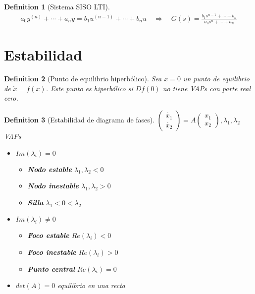 \documentclass[leqno]{article}
\newtheorem*{definition}{Definition}
\begin{document}
\begin{definition}[Sistema SISO LTI]
  \begin{align*}
    a_0y^{(n)} + \cdots + a_ny = b_1 u^{(n-1)} + \cdots + b_n u \quad \Rightarrow \quad G(s)= \frac{b_1s ^{n-1} + \cdots+ b_n}{a_0s^n + \cdots + a_n}
  \end{align*}

\end{definition}

\section{Estabilidad}

\begin{definition}[Punto de equilibrio hiperbólico] Sea  $x=0$ un punto de equilibrio de $\dot{x}=f(x)$. Este punto es hiperbólico si $Df(0)$ no tiene VAPs con parte real cero.

\end{definition}

\begin{definition}[Estabilidad de diagrama de fases] $\begin{pmatrix} \dot{x_1} \\ \dot{x_2}  \end{pmatrix} = A \begin{pmatrix} x_1\\x_2 \end{pmatrix}, \lambda_1, \lambda_2  $ VAPs
\begin{itemize}[topsep=-6pt, itemsep=0pt]
  \item $Im(\lambda_i)=0$
	\begin{itemize}[topsep=-6pt, itemsep=0pt]
	  \item \textbf{Nodo estable} $\lambda_1, \lambda_2<0$
	  \item  \textbf{Nodo inestable} $\lambda_1, \lambda_2>0$
	  \item  \textbf{Silla} $\lambda_1<0<\lambda_2$
	\end{itemize}
  \item $Im(\lambda_i) \neq 0$
	\begin{itemize}[topsep=-6pt, itemsep=0pt]
	  \item   \textbf{Foco estable} $Re(\lambda_i)<0$
	  \item   \textbf{Foco inestable} $Re(\lambda_i)>0$ 
	  \item \textbf{Punto central} $Re(\lambda_i)=0$
	\end{itemize}
  \item $det(A)=0$ equilibrio en una recta
\end{itemize}
\end{definition}
\end{document}
